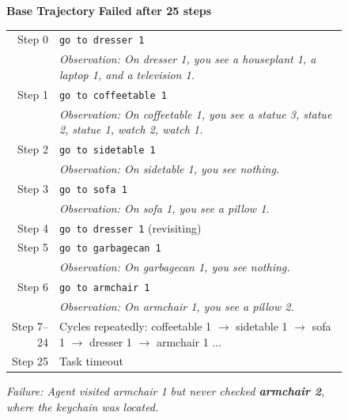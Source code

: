 \begin{figure}[thb]
\centering

\begin{tcolorbox}[
    colback=white,
    colframe=black!70,
    title=\textbf{ALFWorld: Put a keychain in dresser},
    fonttitle=\bfseries\small,
    width=\textwidth,
    boxrule=0.5pt
]

\textbf{Base Trajectory} \hfill \textcolor{red!70!black}{\textbf{Failed after 25 steps}}

\vspace{0.5em}
\footnotesize
\begin{tabularx}{\linewidth}{@{}r@{\hspace{0.8em}}X@{}}
Step 0 & \texttt{go to dresser 1} \\
       & \textit{Observation: On dresser 1, you see a houseplant 1, a laptop 1, and a television 1.} \\[0.3em]
Step 1 & \texttt{go to coffeetable 1} \\
       & \textit{Observation: On coffeetable 1, you see a statue 3, statue 2, statue 1, watch 2, watch 1.} \\[0.3em]
Step 2 & \texttt{go to sidetable 1} \\
       & \textit{Observation: On sidetable 1, you see nothing.} \\[0.3em]
Step 3 & \texttt{go to sofa 1} \\
       & \textit{Observation: On sofa 1, you see a pillow 1.} \\[0.3em]
Step 4 & \texttt{go to dresser 1} \quad (revisiting) \\[0.3em]
Step 5 & \texttt{go to garbagecan 1} \\
       & \textit{Observation: On garbagecan 1, you see nothing.} \\[0.3em]
Step 6 & \texttt{go to armchair 1} \\
       & \textit{Observation: On armchair 1, you see a pillow 2.} \\[0.3em]
Step 7--24 & Cycles repeatedly: coffeetable 1 $\rightarrow$ sidetable 1 $\rightarrow$ sofa 1 $\rightarrow$ dresser 1 $\rightarrow$ armchair 1 ... \\[0.3em]
Step 25 & Task timeout \\
\end{tabularx}

\vspace{0.3em}
\textit{Failure: Agent visited armchair 1 but never checked \textbf{armchair 2}, where the keychain was located.}


\end{tcolorbox}
\end{figure}
